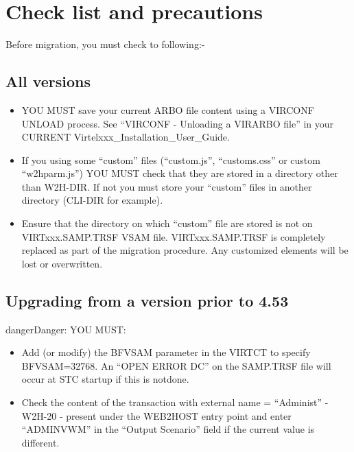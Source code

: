\documentclass[letterpaper,10pt,english]{sphinxmanual}
\begin{document}

\chapter{Check list and precautions}
\label{\detokenize{Migration_Guide:check-list-and-precautions}}\label{\detokenize{Migration_Guide:index-2}}
Before migration, you must check to following:-


\section{All versions}
\label{\detokenize{Migration_Guide:all-versions}}\begin{itemize}
\item {} 
YOU MUST save your current ARBO file content using a VIRCONF UNLOAD process. See “VIRCONF - Unloading a VIRARBO file” in your CURRENT Virtelxxx\_Installation\_User\_Guide.

\item {} 
If you using some “custom” files (“custom.js”, “customs.css” or custom “w2hparm.js”) YOU MUST check that they are stored in a directory other than W2H-DIR. If not you must store your “custom” files in another directory (CLI-DIR for example).

\item {} 
Ensure that the directory on which “custom” file are stored is not on VIRTxxx.SAMP.TRSF VSAM file. VIRTxxx.SAMP.TRSF is completely replaced as part of the migration procedure. Any customized elements will be lost or overwritten.

\end{itemize}


\section{Upgrading from a version prior to 4.53}
\label{\detokenize{Migration_Guide:upgrading-from-a-version-prior-to-4-53}}\label{\detokenize{Migration_Guide:index-3}}
\begin{sphinxadmonition}{danger}{Danger:}
YOU MUST:
\end{sphinxadmonition}
\begin{itemize}
\item {} 
Add (or modify) the BFVSAM parameter in the VIRTCT to specify BFVSAM=32768. An “OPEN ERROR DC” on the SAMP.TRSF file will occur at STC startup if this is notdone.

\item {} 
Check the content of the transaction with external name = “Administ” - W2H-20 - present under the WEB2HOST entry point and enter “ADMINVWM” in the “Output Scenario” field if the current value is different.

\end{itemize}
\end{document}
